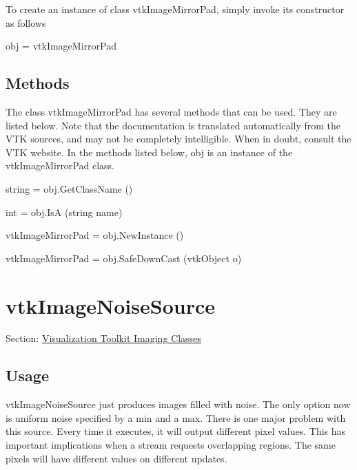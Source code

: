 To create an instance of class vtk\-Image\-Mirror\-Pad, simply invoke its constructor as follows \begin{DoxyVerb}  obj = vtkImageMirrorPad
\end{DoxyVerb}
 \hypertarget{vtkwidgets_vtkxyplotwidget_Methods}{}\subsection{Methods}\label{vtkwidgets_vtkxyplotwidget_Methods}
The class vtk\-Image\-Mirror\-Pad has several methods that can be used. They are listed below. Note that the documentation is translated automatically from the V\-T\-K sources, and may not be completely intelligible. When in doubt, consult the V\-T\-K website. In the methods listed below, {\ttfamily obj} is an instance of the vtk\-Image\-Mirror\-Pad class. 
\begin{DoxyItemize}
\item {\ttfamily string = obj.\-Get\-Class\-Name ()}  
\item {\ttfamily int = obj.\-Is\-A (string name)}  
\item {\ttfamily vtk\-Image\-Mirror\-Pad = obj.\-New\-Instance ()}  
\item {\ttfamily vtk\-Image\-Mirror\-Pad = obj.\-Safe\-Down\-Cast (vtk\-Object o)}  
\end{DoxyItemize}\hypertarget{vtkimaging_vtkimagenoisesource}{}\section{vtk\-Image\-Noise\-Source}\label{vtkimaging_vtkimagenoisesource}
Section\-: \hyperlink{sec_vtkimaging}{Visualization Toolkit Imaging Classes} \hypertarget{vtkwidgets_vtkxyplotwidget_Usage}{}\subsection{Usage}\label{vtkwidgets_vtkxyplotwidget_Usage}
vtk\-Image\-Noise\-Source just produces images filled with noise. The only option now is uniform noise specified by a min and a max. There is one major problem with this source. Every time it executes, it will output different pixel values. This has important implications when a stream requests overlapping regions. The same pixels will have different values on different updates.

